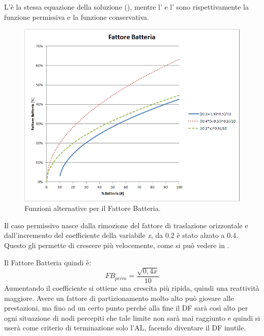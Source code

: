 L'è la stessa equazione della soluzione (), mentre l' e l' sono rispettivamente la funzione permissiva e la funzione conservativa.
\bigskip

\begin{figure}[tb]
	\centering
	\includegraphics[width=0.9\linewidth]{Images/grafici_usati/DF_battery_factor_perm_conserv}
	\caption[Fattore Batteria bis]{Funzioni alternative per il Fattore Batteria.}
	\label{fig:DF_battery_factor_perm_conserv}
\end{figure}
\bigskip


Il caso permissivo nasce dalla rimozione del fattore di traslazione orizzontale e dall'incremento del coefficiente della variabile \textit{x}, da 0.2 è stato alzato a 0.4. Questo gli permette di crescere più velocemente, come si può vedere in .

Il Fattore Batteria quindi è:
\begin{equation}
	FB_{perm}=\dfrac{\sqrt{0,4x}}{10}\nonumber
\end{equation}
Aumentando il coefficiente si ottiene una crescita più ripida, quindi una reattività maggiore. Avere un fattore di partizionamento molto alto può giovare alle prestazioni, ma fino ad un certo punto perché alla fine il DF sarà così alto per ogni situazione di nodi percepiti che tale limite non sarà mai raggiunto e quindi si userà come criterio di terminazione solo l'AL, facendo diventare il DF inutile.

